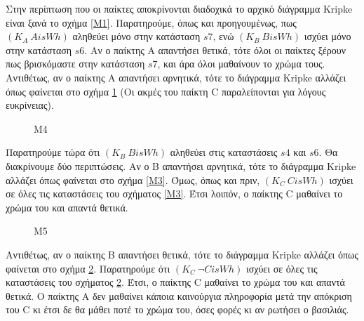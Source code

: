 Στην περίπτωση που οι παίκτες αποκρίνονται διαδοχικά το αρχικό διάγραμμα Kripke είναι ξανά το σχήμα \ref{M1}. Παρατηρούμε, όπως και προηγουμένως, πως $(K_A\ AisWh)$ αληθεύει μόνο στην κατάσταση $s7$, ενώ $(K_B\ BisWh)$ ισχύει μόνο στην κατάσταση $s6$. Αν ο παίκτης A απαντήσει θετικά, τότε όλοι οι παίκτες ξέρουν πως βρισκόμαστε στην κατάσταση $s7$, και άρα όλοι μαθαίνουν το χρώμα τους. Αντιθέτως, αν ο παίκτης A απαντήσει αρνητικά, τότε το διάγραμμα Kripke αλλάζει όπως φαίνεται στο σχήμα \ref{M4} (Οι ακμές του παίκτη C παραλείπονται για λόγους ευκρίνειας). 

\begin{figure}[h!]
\centering
{}
\caption{M4}
\label{M4}
\end{figure}

Παρατηρούμε τώρα ότι $(K_B\ BisWh)$ αληθεύει στις καταστάσεις $s4$ και $s6$. Θα διακρίνουμε δύο περιπτώσεις. Αν ο Β απαντήσει αρνητικά, τότε το διάγραμμα Kripke αλλάζει όπως φαίνεται στο σχήμα \ref{M3}. Όμως, όπως και πριν, $(K_C\ CisWh)$ ισχύει σε όλες τις καταστάσεις του σχήματος \ref{M3}. Έτσι λοιπόν, ο παίκτης C μαθαίνει το χρώμα του και απαντά θετικά.

\begin{figure}[h!]
\centering
{}
\caption{M5}
\label{M5}
\end{figure}

Αντιθέτως, αν ο παίκτης B απαντήσει θετικά, τότε το διάγραμμα Kripke αλλάζει όπως φαίνεται στο σχήμα \ref{M5}. Παρατηρούμε ότι $(K_C\ \neg CisWh)$ ισχύει σε όλες τις καταστάσεις του σχήματος \ref{M5}. Έτσι, ο παίκτης C μαθαίνει το χρώμα του και απαντά θετικά. Ο παίκτης Α δεν μαθαίνει κάποια καινούργια πληροφορία μετά την απόκριση του C κι έτσι δε θα μάθει ποτέ το χρώμα του, όσες φορές κι αν ρωτήσει ο βασιλιάς.